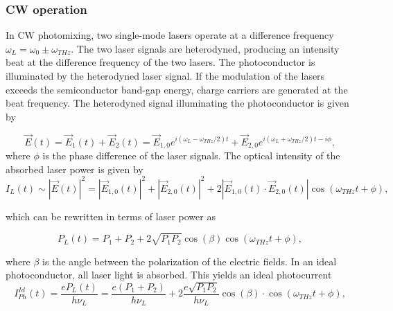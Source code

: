\subsubsection{CW operation}
In CW photomixing, two single-mode lasers operate at a difference frequency $\omega_L = \omega_0 \pm \omega_{THz}$. The two laser signals are heterodyned, producing an intensity beat at the difference frequency of the two lasers. The photoconductor is illuminated by the heterodyned laser signal. If the modulation of the lasers exceeds the semiconductor band-gap energy, charge carriers are generated at the beat frequency. The heterodyned signal illuminating the photoconductor is given by 

\begin{equation}
	\vec{E}(t) = \vec{E}_1(t) + \vec{E}_2(t) = \vec{E}_{1,0}e^{i(\omega_L - \omega_{THz}/2)t} + \vec{E}_{2,0}e^{i(\omega_L + \omega_{THz}/2)t - i\phi},
\end{equation}
where $\phi$ is the phase difference of the laser signals. The optical intensity of the absorbed laser power is given by 
\begin{equation}
	I_L(t) \sim |\vec{E}(t)|^2 = |\vec{E}_{1,0}(t)|^2 + |\vec{E}_{2,0}(t)|^2 + 2|\vec{E}_{1,0}(t) \cdot \vec{E}_{2,0}(t)|\cos(\omega_{THz}t + \phi), 
\end{equation}

which can be rewritten in terms of laser power as 

\begin{equation}
	P_L(t) = P_1 + P_2 + 2\sqrt{P_1 P_2}\cos(\beta)\cos(\omega_{THz}t + \phi), 
\end{equation}

where $\beta$ is the angle between the polarization of the electric fields. In an ideal photoconductor, all laser light is absorbed. This yields an ideal photocurrent 
\begin{equation}
	I_{Ph}^{Id}(t) = \frac{eP_L(t)}{h\nu_L} = \frac{e(P_1+P_2)}{h\nu_L} + 2\frac{e\sqrt{P_1P_2}}{h\nu_L}\cos(\beta)\cdot\cos(\omega_{THz}t + \phi),
	\label{eq_iph}
\end{equation}

